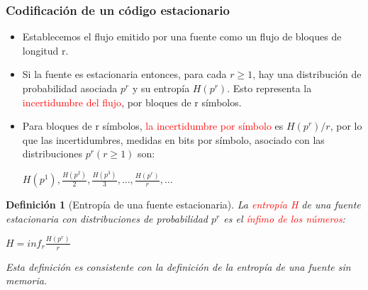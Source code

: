 \documentclass{beamer}
\theoremstyle{plain}
\newtheorem{definicion} [Definicion]{Definición}
\theoremstyle{example}
\theoremstyle{example}
\begin{document}
\begin{frame}  \frametitle{Codificación de un código estacionario}\footnotesize 

\begin{itemize}
\item Establecemos el flujo emitido por una fuente como un flujo de bloques de longitud r. 
\item  Si la fuente es estacionaria entonces, para cada $r \geq 1$, hay una distribución de probabilidad asociada $p^r$ y su entropía $H(p^r)$. Esto representa la \textcolor{red}{incertidumbre del flujo}, por bloques de r símbolos.

\item Para bloques de r símbolos, \textcolor{red}{la incertidumbre por símbolo} es $H(p^r)/r$, por lo que las incertidumbres, medidas en bits por símbolo, asociado con las distribuciones $p^r (r \geq 1)$ son:

\begin{center}
$H(p^1), \frac{H(p^2)}{2}, \frac{H(p^3)}{3}, \ldots, \frac{H(p^r)}{r}, \ldots$
\end{center}


\end{itemize}

\begin{definicion}[Entropía de una fuente estacionaria]
La \textcolor{red}{entropía H} de una fuente estacionaria con distribuciones de probabilidad $p^r$ es el \textcolor{red}{ínfimo de los números}:
 
\begin{center}
$H = inf_r\frac{H(p^r)}{r}$	
\end{center} 

Esta definición es consistente con la definición de la entropía de una fuente sin memoria.
\end{definicion}



\end{frame} 
\end{document}
